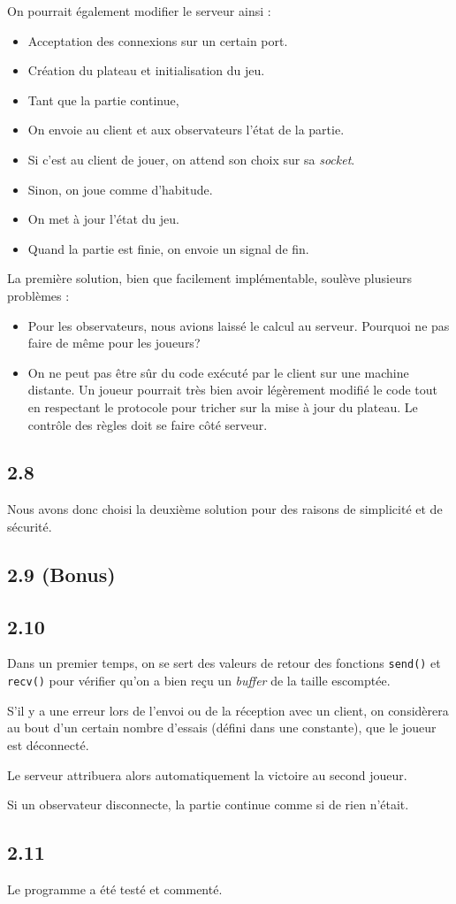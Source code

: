 \documentclass[12pt]{article}
\def\question#1{\subsection{#1}}
\begin{document}
On pourrait également modifier le serveur ainsi :
\begin{itemize}
  \item Acceptation des connexions sur un certain port.
  \item Création du plateau et initialisation du jeu.
  \item Tant que la partie continue,
  \item On envoie au client et aux observateurs l'état de la partie.
  \item Si c'est au client de jouer, on attend son choix sur sa \textit{socket}.
  \item Sinon, on joue comme d'habitude.
  \item On met à jour l'état du jeu.
  \item Quand la partie est finie, on envoie un signal de fin.
\end{itemize}


La première solution, bien que facilement implémentable, soulève plusieurs problèmes :
\begin{itemize}
\item Pour les observateurs, nous avions laissé le calcul au serveur. Pourquoi ne pas faire de même pour les joueurs?
\item On ne peut pas être sûr du code exécuté par le client sur une machine distante. Un joueur pourrait très bien avoir légèrement modifié le code tout en respectant le protocole pour tricher sur la mise à jour du plateau. Le contrôle des règles doit se faire côté serveur.
\end{itemize}



\question{2.8}
Nous avons donc choisi la deuxième solution pour des raisons de simplicité et de sécurité.

\question{2.9 (Bonus)}

\question{2.10}
Dans un premier temps, on se sert des valeurs de retour des fonctions \texttt{send()} et \texttt{recv()} pour vérifier qu'on a bien reçu un \textit{buffer} de la taille escomptée.

S'il y a une erreur lors de l'envoi ou de la réception avec un client, on considèrera au bout d'un certain nombre d'essais (défini dans une constante), que le joueur est déconnecté.

Le serveur attribuera alors automatiquement la victoire au second joueur. 

Si un observateur disconnecte, la partie continue comme si de rien n'était.
\question{2.11}
Le programme a été testé et commenté.
\end{document}
